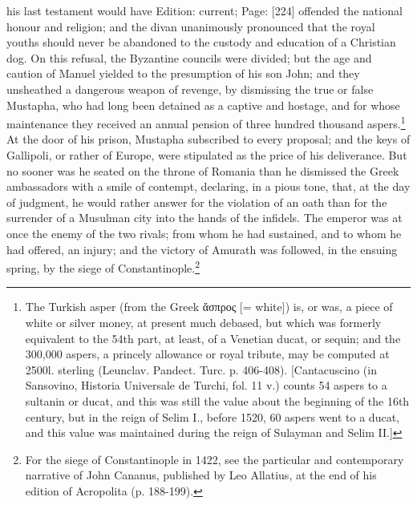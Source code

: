 his last testament would have Edition: current; Page: [224] offended the national honour and religion; and the divan unanimously pronounced that the royal youths should never be abandoned to the custody and education of a Christian dog. On this refusal, the Byzantine councils were divided; but the age and caution of Manuel yielded to the presumption of his son John; and they unsheathed a dangerous weapon of revenge, by dismissing the true or false Mustapha, who had long been detained as a captive and hostage, and for whose maintenance they received an annual pension of three hundred thousand aspers.\footnote{The Turkish asper (from the Greek \textgreek{\texthebrew{ἄ}σπρος} [= white]) is, or was, a piece of white or silver money, at present much debased, but which was formerly equivalent to the 54th part, at least, of a Venetian ducat, or sequin; and the 300,000 aspers, a princely allowance or royal tribute, may be computed at 2500l. sterling (Leunclav. Pandect. Turc. p. 406-408). [Cantacuscino (in Sansovino, Historia Universale de Turchi, fol. 11 v.) counts 54 aspers to a sultanin or ducat, and this was still the value about the beginning of the 16th century, but in the reign of Selim I., before 1520, 60 aspers went to a ducat, and this value was maintained during the reign of Sulayman and Selim II.]} At the door of his prison, Mustapha subscribed to every proposal; and the keys of Gallipoli, or rather of Europe, were stipulated as the price of his deliverance. But no sooner was he seated on the throne of Romania than he dismissed the Greek ambassadors with a smile of contempt, declaring, in a pious tone, that, at the day of judgment, he would rather answer for the violation of an oath than for the surrender of a Musulman city into the hands of the infidels. The emperor was at once the enemy of the two rivals; from whom he had sustained, and to whom he had offered, an injury; and the victory of Amurath was followed, in the ensuing spring, by the siege of Constantinople.\footnote{For the siege of Constantinople in 1422, see the particular and contemporary narrative of John Cananus, published by Leo Allatius, at the end of his edition of Acropolita (p. 188-199).}

